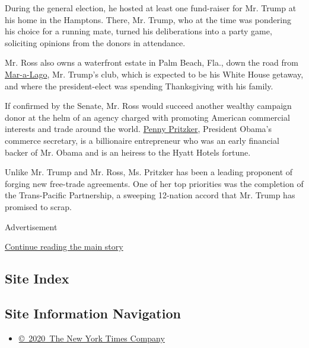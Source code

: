 During the general election, he hosted at least one fund-raiser for Mr.
Trump at his home in the Hamptons. There, Mr. Trump, who at the time was
pondering his choice for a running mate, turned his deliberations into a
party game, soliciting opinions from the donors in attendance.

Mr. Ross also owns a waterfront estate in Palm Beach, Fla., down the
road from
\href{http://www.nytimes3xbfgragh.onion/2016/11/23/us/politics/trumps-palm-beach-neighbors-shrug-and-say-theyve-seen-it-before.html}{Mar-a-Lago},
Mr. Trump's club, which is expected to be his White House getaway, and
where the president-elect was spending Thanksgiving with his family.

If confirmed by the Senate, Mr. Ross would succeed another wealthy
campaign donor at the helm of an agency charged with promoting American
commercial interests and trade around the world.
\href{http://www.nytimes3xbfgragh.onion/2015/10/09/business/penny-pritzker-tackles-tough-assignments-as-commerce-secretary.html}{Penny
Pritzker}, President Obama's commerce secretary, is a billionaire
entrepreneur who was an early financial backer of Mr. Obama and is an
heiress to the Hyatt Hotels fortune.

Unlike Mr. Trump and Mr. Ross, Ms. Pritzker has been a leading proponent
of forging new free-trade agreements. One of her top priorities was the
completion of the Trans-Pacific Partnership, a sweeping 12-nation accord
that Mr. Trump has promised to scrap.

Advertisement

\protect\hyperlink{after-bottom}{Continue reading the main story}

\hypertarget{site-index}{%
\subsection{Site Index}\label{site-index}}

\hypertarget{site-information-navigation}{%
\subsection{Site Information
Navigation}\label{site-information-navigation}}

\begin{itemize}
\tightlist
\item
  \href{https://help.nytimes3xbfgragh.onion/hc/en-us/articles/115014792127-Copyright-notice}{©~2020~The
  New York Times Company}
\end{itemize}

